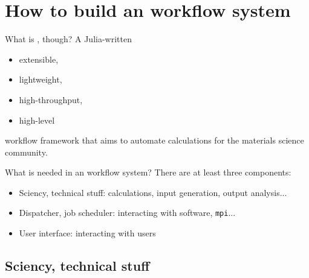 \section{How to build an \ab{} workflow system}

\begin{frame}{What is \express{}, though?}
    A Julia-written
    \begin{itemize}
        \item extensible,
        \item lightweight,
        \item high-throughput,
        \item high-level
    \end{itemize}
    workflow framework that aims to automate \ab{} calculations for the materials science
    community.
\end{frame}

\begin{frame}{What is needed in an \ab{} workflow system?}
    There are at least three components:

    \begin{itemize}
        \item Sciency, technical stuff: calculations, input generation, output analysis...
        \item Dispatcher, job scheduler: interacting with \ab{} software, \texttt{mpi}...
        \item User interface: interacting with users
    \end{itemize}
\end{frame}

\subsection{Sciency, technical stuff}

\begin{frame}{}
\end{frame}
